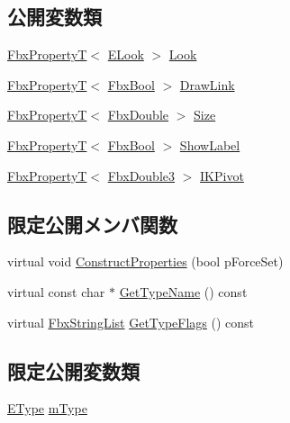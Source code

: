 \subsection*{公開変数類}
\begin{DoxyCompactItemize}
\item 
\hyperlink{class_fbx_property_t}{Fbx\+PropertyT}$<$ \hyperlink{class_fbx_marker_a9e1fa9873c0d6da391d82d0de6a352c4}{E\+Look} $>$ \hyperlink{class_fbx_marker_a2d9dd3145381febcecd131cfce58cf65}{Look}
\item 
\hyperlink{class_fbx_property_t}{Fbx\+PropertyT}$<$ \hyperlink{fbxtypes_8h_a92e0562b2fe33e76a242f498b362262e}{Fbx\+Bool} $>$ \hyperlink{class_fbx_marker_a7ad25f4f97b2e7ac7effeb6e9dc63e4f}{Draw\+Link}
\item 
\hyperlink{class_fbx_property_t}{Fbx\+PropertyT}$<$ \hyperlink{fbxtypes_8h_a171e72a1c46fc15c1a6c9c31948c1c5b}{Fbx\+Double} $>$ \hyperlink{class_fbx_marker_af2ee6f3a36ab8b34bde07450aca06f04}{Size}
\item 
\hyperlink{class_fbx_property_t}{Fbx\+PropertyT}$<$ \hyperlink{fbxtypes_8h_a92e0562b2fe33e76a242f498b362262e}{Fbx\+Bool} $>$ \hyperlink{class_fbx_marker_a69f9f3df5f70b603a2edf4393873ed14}{Show\+Label}
\item 
\hyperlink{class_fbx_property_t}{Fbx\+PropertyT}$<$ \hyperlink{fbxtypes_8h_ae0a96f14cde566774c7553aa7523b7a7}{Fbx\+Double3} $>$ \hyperlink{class_fbx_marker_a5bd3a4b16e95b47ea5d391941cb6f00c}{I\+K\+Pivot}
\end{DoxyCompactItemize}
\subsection*{限定公開メンバ関数}
\begin{DoxyCompactItemize}
\item 
virtual void \hyperlink{class_fbx_marker_a02a9ec30c7dc256cce288e2f9961b507}{Construct\+Properties} (bool p\+Force\+Set)
\item 
virtual const char $\ast$ \hyperlink{class_fbx_marker_a8418dc0f13a8197949a412604787c60d}{Get\+Type\+Name} () const
\item 
virtual \hyperlink{class_fbx_string_list}{Fbx\+String\+List} \hyperlink{class_fbx_marker_aba200b5397b2fe0397e782ea0a602890}{Get\+Type\+Flags} () const
\end{DoxyCompactItemize}
\subsection*{限定公開変数類}
\begin{DoxyCompactItemize}
\item 
\hyperlink{class_fbx_marker_ad1e38753dce9a2212df0364466d9f617}{E\+Type} \hyperlink{class_fbx_marker_ad3808ca152160cea3a100715d2511ec0}{m\+Type}
\end{DoxyCompactItemize}
